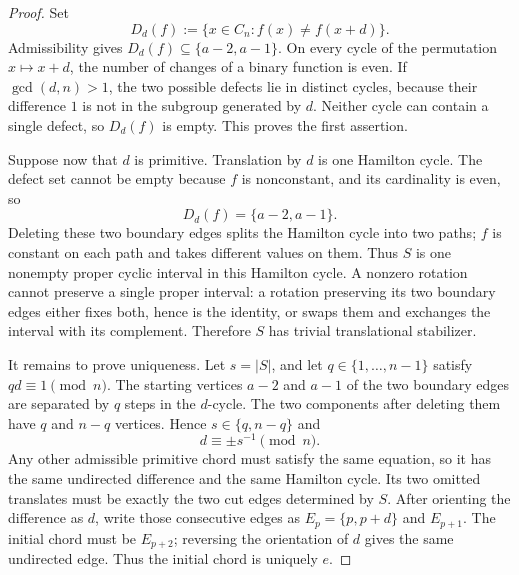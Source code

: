 \documentclass[11pt,a4paper]{amsart}
\theoremstyle{definition}
\theoremstyle{remark}
\newcommand{\Cn}{C_n}
\newcommand{\card}[1]{\lvert #1\rvert}
\begin{document}
\begin{proof}
Set
\[
 D_d(f):=\{x\in\Cn:f(x)\ne f(x+d)\}.
\]
Admissibility gives
$D_d(f)\subseteq\{a-2,a-1\}$.  On every cycle of the permutation
$x\mapsto x+d$, the number of changes of a binary function is even.  If
$\gcd(d,n)>1$, the two possible defects lie in distinct cycles, because
their difference $1$ is not in the subgroup generated by $d$.  Neither
cycle can contain a single defect, so $D_d(f)$ is empty.  This proves the
first assertion.

Suppose now that $d$ is primitive.  Translation by $d$ is one Hamilton
cycle.  The defect set cannot be empty because $f$ is nonconstant, and its
cardinality is even, so
\begin{equation}\label{eq:defects}
             D_d(f)=\{a-2,a-1\}.
\end{equation}
Deleting these two boundary edges splits the Hamilton cycle into two paths;
$f$ is constant on each path and takes different values on them.  Thus $S$
is one nonempty proper cyclic interval in this Hamilton cycle.  A nonzero
rotation cannot preserve a single proper interval: a rotation preserving
its two boundary edges either fixes both, hence is the identity, or swaps
them and exchanges the interval with its complement.  Therefore $S$ has
trivial translational stabilizer.

It remains to prove uniqueness.  Let $s=\card S$, and let
$q\in\{1,\ldots,n-1\}$ satisfy $qd\equiv1\pmod n$.  The starting vertices
$a-2$ and $a-1$ of the two boundary edges are separated by $q$ steps in the
$d$-cycle.  The two components after deleting them have $q$ and $n-q$
vertices.  Hence $s\in\{q,n-q\}$ and
\begin{equation}\label{eq:recover-d}
                   d\equiv\pm s^{-1}\pmod n.
\end{equation}
Any other admissible primitive chord must satisfy the same equation, so it
has the same undirected difference and the same Hamilton cycle.  Its two
omitted translates must be exactly the two cut edges determined by $S$.
After orienting the difference as $d$, write those consecutive edges as
$E_p=\{p,p+d\}$ and $E_{p+1}$.  The initial chord must be $E_{p+2}$;
reversing the orientation of $d$ gives the same undirected edge.  Thus the
initial chord is uniquely $e$.
\end{proof}
\end{document}
